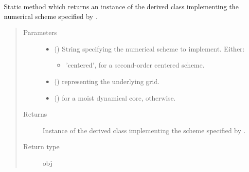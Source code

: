 \documentclass[letterpaper,10pt,english]{sphinxmanual}
\begin{document}
\begin{fulllineitems}
\begin{fulllineitems}
\label{\detokenize{api:dycore.flux_isentropic_nonconservative.FluxIsentropicNonconservative.factory}}
Static method which returns an instance of the derived class implementing the numerical scheme
specified by .
\begin{quote}\begin{description}
\item[{Parameters}] \leavevmode\begin{itemize}
\item {} 
 () \textendash{} 
String specifying the numerical scheme to implement. Either:
\begin{itemize}
\item {} 
’centered’, for a second-order centered scheme.

\end{itemize}


\item {} 
 () \textendash{} {\hyperref[\detokenize{api:grids.grid_xyz.GridXYZ}]{}} representing the underlying grid.

\item {} 
 () \textendash{}  for a moist dynamical core,  otherwise.

\end{itemize}

\item[{Returns}] \leavevmode
Instance of the derived class implementing the scheme specified by .

\item[{Return type}] \leavevmode
obj

\end{description}\end{quote}

\end{fulllineitems}



\end{fulllineitems}
\end{document}
